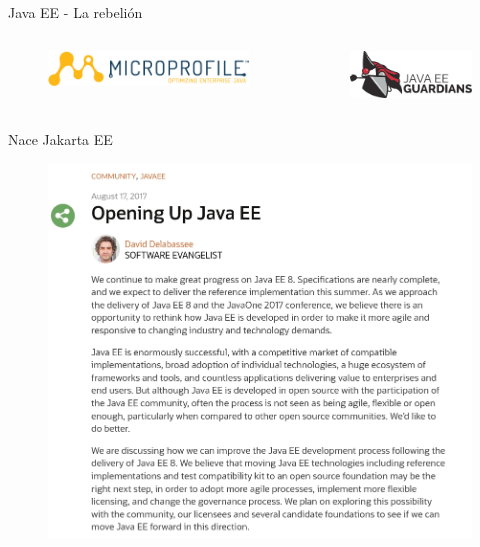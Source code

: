 \documentclass[aspectratio=169]{beamer}
\begin{document}
\begin{frame}{Java EE - La rebelión}
\begin{columns}
\begin{column}{0.5\textwidth}
\begin{figure}
\centering
\includegraphics[width=\linewidth]{Images/microprofile-logo}
\end{figure}
\end{column}
\begin{column}{0.5\textwidth}  %
\begin{figure}
\centering
\includegraphics[width=\linewidth]{Images/guardians}
\end{figure}
\end{column}
\end{columns}
\end{frame}

\begin{frame}{Nace Jakarta EE}
\begin{figure}
	\centering
	\includegraphics[width=0.7\linewidth]{Images/javaeeopen}
\end{figure}
\end{frame}
\end{document}
